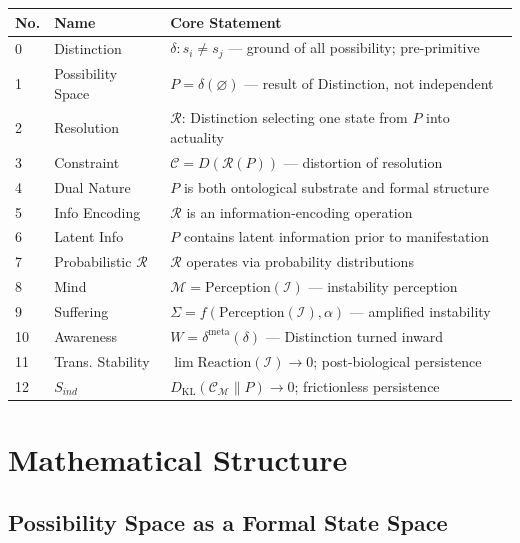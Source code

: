 \documentclass[12pt, a4paper]{article}
\begin{document}
\begin{center}
\renewcommand{\arraystretch}{1.3}
\begin{tabular}{p{0.8cm} p{3.2cm} p{8.5cm}}
\toprule
\textbf{No.} & \textbf{Name} & \textbf{Core Statement} \\
\midrule
0 & Distinction & $\delta: s_i \neq s_j$ --- ground of all possibility; pre-primitive \\
1 & Possibility Space & $P = \delta(\varnothing)$ --- result of Distinction, not independent \\
2 & Resolution & $\mathcal{R}$: Distinction selecting one state from $P$ into actuality \\
3 & Constraint & $\mathcal{C} = D(\mathcal{R}(P))$ --- distortion of resolution \\
4 & Dual Nature & $P$ is both ontological substrate and formal structure \\
5 & Info Encoding & $\mathcal{R}$ is an information-encoding operation \\
6 & Latent Info & $P$ contains latent information prior to manifestation \\
7 & Probabilistic $\mathcal{R}$ & $\mathcal{R}$ operates via probability distributions \\
8 & Mind & $\mathcal{M} = \mathrm{Perception}(\mathcal{I})$ --- instability perception \\
9 & Suffering & $\Sigma = f(\mathrm{Perception}(\mathcal{I}),\alpha)$ --- amplified instability \\
10 & Awareness & $W = \delta^{\mathrm{meta}}(\delta)$ --- Distinction turned inward \\
11 & Trans. Stability & $\lim \mathrm{Reaction}(\mathcal{I})\to 0$; post-biological persistence \\
12 & $S_{ind}$ & $D_{\mathrm{KL}}(\mathcal{C}_\mathcal{M}\|P)\to 0$; frictionless persistence \\
\bottomrule
\end{tabular}
\end{center}

\section{Mathematical Structure}

\subsection{Possibility Space as a Formal State Space}
\end{document}
